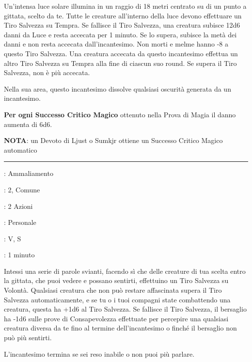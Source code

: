 \begin{multicols}{2}
Un'intensa luce solare illumina in un raggio di 18 metri centrato su di un punto a gittata, scelto da te. Tutte le creature all'interno della luce devono effettuare un Tiro Salvezza su Tempra. Se fallisce il Tiro Salvezza, una creatura subisce 12d6 danni da Luce e resta accecata per 1 minuto. Se lo supera, subisce la metà dei danni e non resta accecata dall'incantesimo. Non morti e melme hanno -8 a questo Tiro Salvezza. Una creatura accecata da questo incantesimo effettua un altro Tiro Salvezza su Tempra alla fine di ciascun suo round. Se supera il Tiro Salvezza, non è più accecata.

Nella sua area, questo incantesimo dissolve qualsiasi oscurità generata da un incantesimo.

\textbf{Per ogni Successo Critico Magico} ottenuto nella Prova di Magia il danno aumenta di 6d6.

\textbf{NOTA}: un Devoto di Ljust o Sumkjr ottiene un Successo Critico Magico automatico

\smallskip\noindent\rule{\linewidth}{2pt} \hypertarget{Estasiare}{}\smallskip{}
\noindent
\begin{description}[noitemsep, topsep=0pt, parsep=0pt, partopsep=0pt, leftmargin=0cm, labelwidth=2.8cm]
	\item[\textbf{Lista di Magia}]: Ammaliamento
	\item[\textbf{Livello}]: 2, Comune
	\item[\textbf{T. di Lancio}]: 2 Azioni
	\item[\textbf{Gittata}]: Personale
	\item[\textbf{Componenti}]: V, S
	\item[\textbf{Durata}]: 1 minuto
\end{description}

Intessi una serie di parole svianti, facendo sì che delle creature di tua scelta entro la gittata, che puoi vedere e possano sentirti, effettuino un Tiro Salvezza su Volontà. Qualsiasi creatura che non può restare affascinata supera il Tiro Salvezza automaticamente, e se tu o i tuoi compagni state combattendo una creatura, questa ha +1d6 al Tiro Salvezza. Se fallisce il Tiro Salvezza, il bersaglio ha -1d6 sulle prove di Consapevolezza effettuate per percepire una qualsiasi creatura diversa da te fino al termine dell'incantesimo o finché il bersaglio non può più sentirti.

L'incantesimo termina se sei reso inabile o non puoi più parlare.


\end{multicols}
